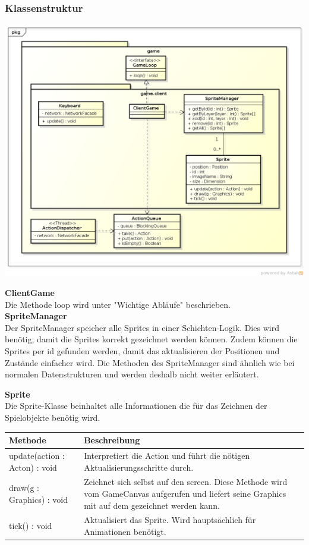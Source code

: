 \documentclass[11pt]{scrartcl}
\begin{document}
\subsubsection{Klassenstruktur}
\includegraphics[scale=0.5]{ClassDiagramGameClient}

\textbf{ClientGame}\\
Die Methode loop wird unter "Wichtige Abläufe" beschrieben.\\

\textbf{SpriteManager}\\
Der SpriteManager speicher alle Sprites in einer Schichten-Logik. Dies wird benötig, damit die Sprites korrekt gezeichnet werden können. Zudem können die Sprites per id gefunden werden, damit das aktualisieren der Positionen und Zustände einfacher wird. Die Methoden des SpriteManager sind ähnlich wie bei normalen Datenstrukturen und werden deshalb nicht weiter erläutert.

\newpage

\textbf{Sprite}\\
Die Sprite-Klasse beinhaltet alle Informationen die für das Zeichnen der Spielobjekte benötig wird.\\


\begin{tabularx}{\linewidth}{l X}
\textbf{Methode} & \textbf{Beschreibung}\\
\hline
update(action : Acton) : void & Interpretiert die Action und führt die nötigen Aktualisierungsschritte durch.\\
draw(g : Graphics) : void & Zeichnet sich selbst auf den screen. Diese Methode wird vom GameCanvas aufgerufen und liefert seine Graphics mit auf dem gezeichnet werden kann.\\
tick() : void & Aktualisiert das Sprite. Wird hauptsächlich für Animationen benötigt.\\
\end{tabularx}\\\\
\end{document}

